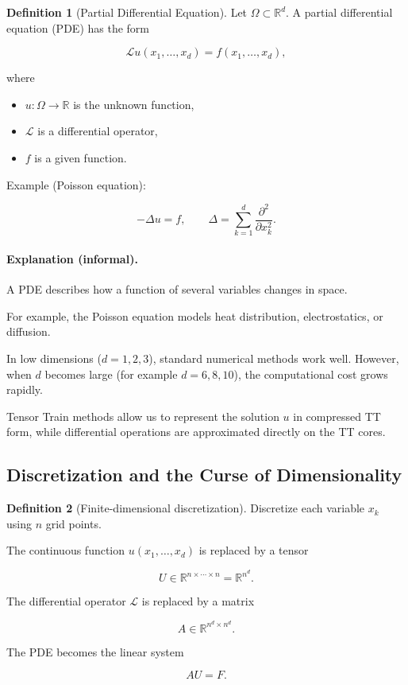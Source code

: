 \documentclass[11pt,a4paper,parskip=half-]{scrartcl}
\theoremstyle{definition}
\newtheorem{definition}{Definition}[section]
\theoremstyle{plain}
\theoremstyle{remark}
\begin{document}
\begin{definition}[Partial Differential Equation]

  Let $\Omega \subset \mathbb{R}^d$.
  A partial differential equation (PDE) has the form

  \[
    \mathcal{L} u(x_1,\dots,x_d) = f(x_1,\dots,x_d),
  \]

  where

  \begin{itemize}
    \item $u : \Omega \to \mathbb{R}$ is the unknown function,
    \item $\mathcal{L}$ is a differential operator,
    \item $f$ is a given function.
  \end{itemize}

  Example (Poisson equation):

  \[
    -\Delta u = f,
    \qquad
    \Delta = \sum_{k=1}^d \frac{\partial^2}{\partial x_k^2}.
  \]

\end{definition}

\paragraph{Explanation (informal).}

A PDE describes how a function of several variables changes in space.

For example, the Poisson equation models heat distribution, electrostatics, or
diffusion.

In low dimensions ($d=1,2,3$), standard numerical methods work well.
However, when $d$ becomes large (for example $d=6,8,10$), the computational cost
grows rapidly.

Tensor Train methods allow us to represent the solution $u$ in compressed
TT form, while differential operations are approximated directly on the TT
cores.

\subsection{Discretization and the Curse of Dimensionality}

\begin{definition}[Finite-dimensional discretization]

  Discretize each variable $x_k$ using $n$ grid points.

  The continuous function $u(x_1,\dots,x_d)$ is replaced by a tensor

  \[
    U \in \mathbb{R}^{n \times \cdots \times n}
    = \mathbb{R}^{n^d}.
  \]

  The differential operator $\mathcal{L}$ is replaced by a matrix

  \[
    A \in \mathbb{R}^{n^d \times n^d}.
  \]

  The PDE becomes the linear system

  \[
    A U = F.
  \]

\end{definition}
\end{document}
